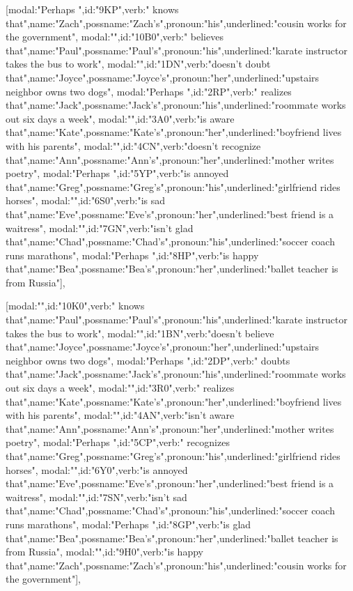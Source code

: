 [{modal:"Perhaps ",id:"9KP",verb:" knows that",name:"Zach",possname:"Zach's",pronoun:"his",underlined:"cousin works for the government"},
{modal:"",id:"10B0",verb:" believes that",name:"Paul",possname:"Paul's",pronoun:"his",underlined:"karate instructor takes the bus to work"},
{modal:"",id:"1DN",verb:"doesn't doubt that",name:"Joyce",possname:"Joyce's",pronoun:"her",underlined:"upstairs neighbor owns two dogs"},
{modal:"Perhaps ",id:"2RP",verb:" realizes that",name:"Jack",possname:"Jack's",pronoun:"his",underlined:"roommate works out six days a week"},
{modal:"",id:"3A0",verb:"is aware that",name:"Kate",possname:"Kate's",pronoun:"her",underlined:"boyfriend lives with his parents"},
{modal:"",id:"4CN",verb:"doesn't recognize that",name:"Ann",possname:"Ann's",pronoun:"her",underlined:"mother writes poetry"},
{modal:"Perhaps ",id:"5YP",verb:"is annoyed that",name:"Greg",possname:"Greg's",pronoun:"his",underlined:"girlfriend rides horses"},
{modal:"",id:"6S0",verb:"is sad that",name:"Eve",possname:"Eve's",pronoun:"her",underlined:"best friend is a waitress"},
{modal:"",id:"7GN",verb:"isn't glad that",name:"Chad",possname:"Chad's",pronoun:"his",underlined:"soccer coach runs marathons"},
{modal:"Perhaps ",id:"8HP",verb:"is happy that",name:"Bea",possname:"Bea's",pronoun:"her",underlined:"ballet teacher is from Russia"}],

[{modal:"",id:"10K0",verb:" knows that",name:"Paul",possname:"Paul's",pronoun:"his",underlined:"karate instructor takes the bus to work"},
{modal:"",id:"1BN",verb:"doesn't believe that",name:"Joyce",possname:"Joyce's",pronoun:"her",underlined:"upstairs neighbor owns two dogs"},
{modal:"Perhaps ",id:"2DP",verb:" doubts that",name:"Jack",possname:"Jack's",pronoun:"his",underlined:"roommate works out six days a week"},
{modal:"",id:"3R0",verb:" realizes that",name:"Kate",possname:"Kate's",pronoun:"her",underlined:"boyfriend lives with his parents"},
{modal:"",id:"4AN",verb:"isn't aware that",name:"Ann",possname:"Ann's",pronoun:"her",underlined:"mother writes poetry"},
{modal:"Perhaps ",id:"5CP",verb:" recognizes that",name:"Greg",possname:"Greg's",pronoun:"his",underlined:"girlfriend rides horses"},
{modal:"",id:"6Y0",verb:"is annoyed that",name:"Eve",possname:"Eve's",pronoun:"her",underlined:"best friend is a waitress"},
{modal:"",id:"7SN",verb:"isn't sad that",name:"Chad",possname:"Chad's",pronoun:"his",underlined:"soccer coach runs marathons"},
{modal:"Perhaps ",id:"8GP",verb:"is glad that",name:"Bea",possname:"Bea's",pronoun:"her",underlined:"ballet teacher is from Russia"},
{modal:"",id:"9H0",verb:"is happy that",name:"Zach",possname:"Zach's",pronoun:"his",underlined:"cousin works for the government"}],

